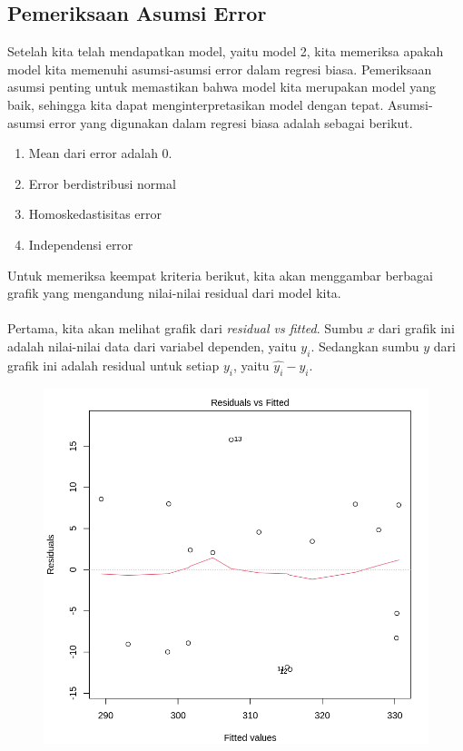\begin{enumerate}
\subsection{Pemeriksaan Asumsi Error}
Setelah kita telah mendapatkan model, yaitu model 2, kita memeriksa apakah model kita memenuhi asumsi-asumsi error dalam regresi biasa. Pemeriksaan asumsi penting untuk memastikan bahwa model kita merupakan model yang baik, sehingga kita dapat menginterpretasikan model dengan tepat. Asumsi-asumsi error yang digunakan dalam regresi biasa adalah sebagai berikut.
\begin{enumerate}
    \item Mean dari error adalah 0.
    \item Error berdistribusi normal 
    \item Homoskedastisitas error
    \item Independensi error
\end{enumerate}
Untuk memeriksa keempat kriteria berikut, kita akan menggambar berbagai grafik yang mengandung nilai-nilai residual dari model kita.
\\~\\
Pertama, kita akan melihat grafik dari \textit{residual vs fitted}. Sumbu $x$ dari grafik ini adalah nilai-nilai data dari variabel dependen, yaitu $y_i$. Sedangkan sumbu $y$ dari grafik ini adalah residual untuk setiap $y_i$, yaitu $\hat{y_i}-y_i$.\\
\begin{figure}[h!]
    \centering
    \includegraphics[scale=0.5]{src/Pics/res vs fitted.png}

\end{figure}
\end{enumerate}
